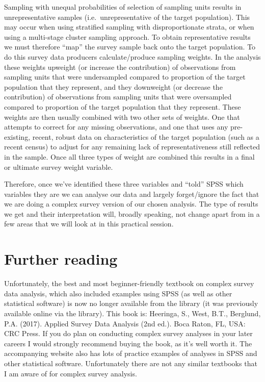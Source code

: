 \documentclass[
]{book}
\begin{document}
Sampling with unequal probabilities of selection of sampling units results in unrepresentative samples (i.e.~unrepresentative of the target population). This may occur when using stratified sampling with disproportionate strata, or when using a multi-stage cluster sampling approach. To obtain representative results we must therefore ``map'' the survey sample back onto the target population. To do this survey data producers calculate/produce sampling weights. In the analysis these weights upweight (or increase the contribution) of observations from sampling units that were undersampled compared to proportion of the target population that they represent, and they downweight (or decrease the contribution) of observations from sampling units that were oversampled compared to proportion of the target population that they represent. These weights are then usually combined with two other sets of weights. One that attempts to correct for any missing observations, and one that uses any pre-existing, recent, robust data on characteristics of the target population (such as a recent census) to adjust for any remaining lack of representativeness still reflected in the sample. Once all three types of weight are combined this results in a final or ultimate survey weight variable.

Therefore, once we've identified these three variables and ``told'' SPSS which variables they are we can analyse our data and largely forget/ignore the fact that we are doing a complex survey version of our chosen analysis. The type of results we get and their interpretation will, broadly speaking, not change apart from in a few areas that we will look at in this practical session.

\hypertarget{further-reading}{%
\section{Further reading}\label{further-reading}}

Unfortunately, the best and most beginner-friendly textbook on complex survey data analysis, which also included examples using SPSS (as well as other statistical software) is now no longer available from the library (it was previously available online via the library). This book is: Heeringa, S., West, B.T., Berglund, P.A. (2017). Applied Survey Data Analysis (2nd ed.). Boca Raton, FL, USA: CRC Press. If you do plan on conducting complex survey analyses in your later careers I would strongly recommend buying the book, as it's well worth it. The accompanying website also has lots of practice examples of analyses in SPSS and other statistical software. Unfortunately there are not any similar textbooks that I am aware of for complex survey analysis.
\end{document}
